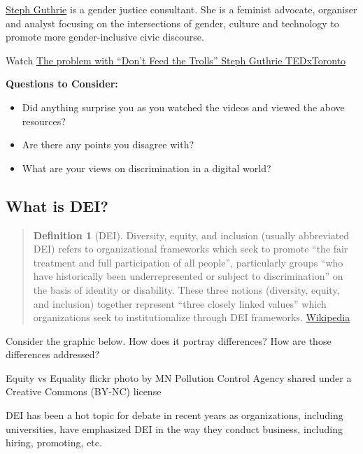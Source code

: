 \documentclass[
]{book}
\providecommand{\tightlist}{%
  \setlength{\itemsep}{0pt}\setlength{\parskip}{0pt}}
\theoremstyle{definition}
\newtheorem{definition}{Definition}[chapter]
\theoremstyle{definition}
\theoremstyle{definition}
\theoremstyle{definition}
\theoremstyle{remark}
\begin{document}
\begin{reflect}
\href{https://stephguthrie.com/}{Steph Guthrie} is a gender justice consultant. She is a feminist advocate, organiser and analyst focusing on the intersections of gender, culture and technology to promote more gender-inclusive civic discourse.

Watch \href{https://www.youtube.com/watch?v=_KHEkR5yb9A}{The problem with ``Don't Feed the Trolls'' \textbar{} Steph Guthrie \textbar{} TEDxToronto}

\textbf{Questions to Consider:}

\begin{itemize}
\tightlist
\item
  Did anything surprise you as you watched the videos and viewed the above resources?
\item
  Are there any points you disagree with?
\item
  What are your views on discrimination in a digital world?
\end{itemize}
\end{reflect}

\hypertarget{what-is-dei}{%
\subsection*{What is DEI?}\label{what-is-dei}}

\begin{quote}
\begin{definition}[DEI]
\protect\hypertarget{def:dei}{}\label{def:dei}Diversity, equity, and inclusion (usually abbreviated DEI) refers to organizational frameworks which seek to promote ``the fair treatment and full participation of all people'', particularly groups ``who have historically been underrepresented or subject to discrimination'' on the basis of identity or disability. These three notions (diversity, equity, and inclusion) together represent ``three closely linked values'' which organizations seek to institutionalize through DEI frameworks. \href{https://en.wikipedia.org/wiki/Diversity,_equity,_and_inclusion}{Wikipedia}
\end{definition}
\end{quote}

Consider the graphic below. How does it portray differences? How are those differences addressed?

Equity vs Equality flickr photo by MN Pollution Control Agency shared under a Creative Commons (BY-NC) license

DEI has been a hot topic for debate in recent years as organizations, including universities, have emphasized DEI in the way they conduct business, including hiring, promoting, etc.
\end{document}
